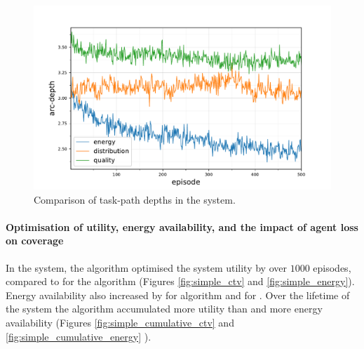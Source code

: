 \begin{figure}[ht]
	\begin{minipage}{.49\textwidth}
		\centering
		\includegraphics[width=1.0\linewidth,trim={25pt 0pt 50pt 0pt},clip]{5.19_ctv-arc-depth-comparison}
		\caption{Comparison of task-path depths  in the \simulationExtended{}{} system.}
		\label{fig:extended_arc_depth}
	\end{minipage}\hfill%
\begin{minipage}{.49\textwidth}
\end{minipage}
\end{figure}

\paragraph{Optimisation of utility, energy availability, and the  impact of agent loss on coverage}
In the \simulationSimple{}{} system, the \acronymWSNOptimisation{}{} algorithm optimised the system utility by \resultsSimpleCTVBalancedDiff{}{} over $1000$ episodes, compared to \resultsSimpleCTVQRoutingDiff{}{} for the \algorithmBaseline{}{} algorithm (Figures \ref{fig:simple_ctv} and \ref{fig:simple_energy}). Energy availability also increased by \resultsSimpleEnergyBalancedDiff{}{} for \algorithmBalanced{}{} algorithm and \resultsSimpleEnergyQRoutingDiff{}{} for \algorithmBaseline{}{}. Over the lifetime of the system the \algorithmBalanced{}{} algorithm accumulated \resultsSimpleCumulativeCTVComparison{}{} more utility than \algorithmBaseline{}{} and \resultsSimpleCumulativeEnergyComparison{}{} more energy availability (Figures \ref{fig:simple_cumulative_ctv} and \ref{fig:simple_cumulative_energy} ).

